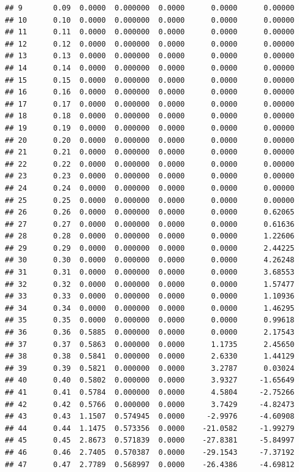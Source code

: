 \documentclass{article}\usepackage[]{graphicx}\usepackage[]{color}
\makeatletter
\newenvironment{kframe}{%
 \def\at@end@of@kframe{}%
 \ifinner\ifhmode%
  \def\at@end@of@kframe{\end{minipage}}%
  \begin{minipage}{\columnwidth}%
 \fi\fi%
 \def\FrameCommand##1{\hskip\@totalleftmargin \hskip-\fboxsep
 \colorbox{shadecolor}{##1}\hskip-\fboxsep
     \hskip-\linewidth \hskip-\@totalleftmargin \hskip\columnwidth}%
 \MakeFramed {\advance\hsize-\width
   \@totalleftmargin\z@ \linewidth\hsize
   \@setminipage}}%
 {\par\unskip\endMakeFramed%
 \at@end@of@kframe}
\newenvironment{knitrout}{}{} %
\makeatother
\begin{document}
\begin{knitrout}
\begin{kframe}
\begin{verbatim}
## 9       0.09  0.0000  0.000000  0.0000      0.0000      0.00000
## 10      0.10  0.0000  0.000000  0.0000      0.0000      0.00000
## 11      0.11  0.0000  0.000000  0.0000      0.0000      0.00000
## 12      0.12  0.0000  0.000000  0.0000      0.0000      0.00000
## 13      0.13  0.0000  0.000000  0.0000      0.0000      0.00000
## 14      0.14  0.0000  0.000000  0.0000      0.0000      0.00000
## 15      0.15  0.0000  0.000000  0.0000      0.0000      0.00000
## 16      0.16  0.0000  0.000000  0.0000      0.0000      0.00000
## 17      0.17  0.0000  0.000000  0.0000      0.0000      0.00000
## 18      0.18  0.0000  0.000000  0.0000      0.0000      0.00000
## 19      0.19  0.0000  0.000000  0.0000      0.0000      0.00000
## 20      0.20  0.0000  0.000000  0.0000      0.0000      0.00000
## 21      0.21  0.0000  0.000000  0.0000      0.0000      0.00000
## 22      0.22  0.0000  0.000000  0.0000      0.0000      0.00000
## 23      0.23  0.0000  0.000000  0.0000      0.0000      0.00000
## 24      0.24  0.0000  0.000000  0.0000      0.0000      0.00000
## 25      0.25  0.0000  0.000000  0.0000      0.0000      0.00000
## 26      0.26  0.0000  0.000000  0.0000      0.0000      0.62065
## 27      0.27  0.0000  0.000000  0.0000      0.0000      0.61636
## 28      0.28  0.0000  0.000000  0.0000      0.0000      1.22606
## 29      0.29  0.0000  0.000000  0.0000      0.0000      2.44225
## 30      0.30  0.0000  0.000000  0.0000      0.0000      4.26248
## 31      0.31  0.0000  0.000000  0.0000      0.0000      3.68553
## 32      0.32  0.0000  0.000000  0.0000      0.0000      1.57477
## 33      0.33  0.0000  0.000000  0.0000      0.0000      1.10936
## 34      0.34  0.0000  0.000000  0.0000      0.0000      1.46295
## 35      0.35  0.0000  0.000000  0.0000      0.0000      0.99618
## 36      0.36  0.5885  0.000000  0.0000      0.0000      2.17543
## 37      0.37  0.5863  0.000000  0.0000      1.1735      2.45650
## 38      0.38  0.5841  0.000000  0.0000      2.6330      1.44129
## 39      0.39  0.5821  0.000000  0.0000      3.2787      0.03024
## 40      0.40  0.5802  0.000000  0.0000      3.9327     -1.65649
## 41      0.41  0.5784  0.000000  0.0000      4.5804     -2.75266
## 42      0.42  0.5766  0.000000  0.0000      3.7429     -4.82473
## 43      0.43  1.1507  0.574945  0.0000     -2.9976     -4.60908
## 44      0.44  1.1475  0.573356  0.0000    -21.0582     -1.99279
## 45      0.45  2.8673  0.571839  0.0000    -27.8381     -5.84997
## 46      0.46  2.7405  0.570387  0.0000    -29.1543     -7.37192
## 47      0.47  2.7789  0.568997  0.0000    -26.4386     -4.69812

\end{verbatim}
\end{kframe}
\end{knitrout}
\end{document}
